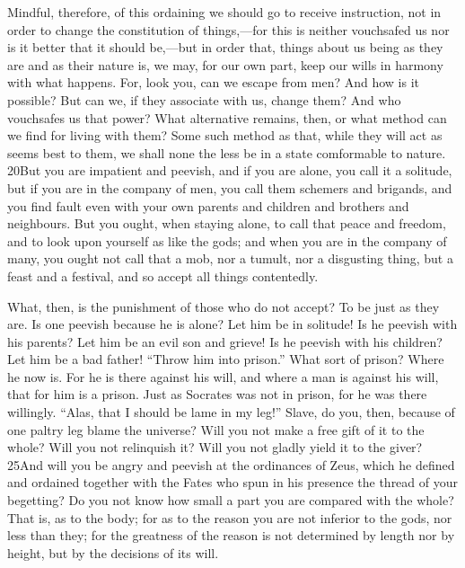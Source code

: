 Mindful, therefore, of this ordaining we should go to receive instruction, not in order to change the constitution of things,—for this is neither vouchsafed us nor is it better that it should be,—but in order that, things about us being as they are and as their nature is, we may, for our own part, keep our wills in harmony with what happens. For, look you, can we escape from men? And how is it possible? But can we, if they associate with us, change them? And who vouchsafes us that power? What alternative remains, then, or what method can we find for living with them? Some such method as that, while they will act as seems best to them, we shall none the less be in a state comformable to nature. 20But you are impatient and peevish, and if you are alone, you call it a solitude, but if you are in the company of men, you call them schemers and brigands, and you find fault even with your own parents and children and brothers and neighbours. But you ought, when staying alone, to call that peace and freedom, and to look upon yourself as like the gods; and when you are in the company of many, you ought not call that a mob, nor a tumult, nor a disgusting thing, but a feast and a festival, and so accept all things contentedly.

What, then, is the punishment of those who do not accept? To be just as they are. Is one peevish because he is alone? Let him be in solitude! Is he peevish with his parents? Let him be an evil son and grieve! Is he peevish with his children? Let him be a bad father! ``Throw him into prison.'' What sort of prison? Where he now is. For he is there against his will, and where a man is against his will, that for him is a prison. Just as Socrates was not in prison, for he was there willingly. ``Alas, that I should be lame in my leg!'' Slave, do you, then, because of one paltry leg blame the universe? Will you not make a free gift of it to the whole? Will you not relinquish it? Will you not gladly yield it to the giver? 25And will you be angry and peevish at the ordinances of Zeus, which he defined and ordained together with the Fates who spun in his presence the thread of your begetting? Do you not know how small a part you are compared with the whole? That is, as to the body; for as to the reason you are not inferior to the gods, nor less than they; for the greatness of the reason is not determined by length nor by height, but by the decisions of its will.

